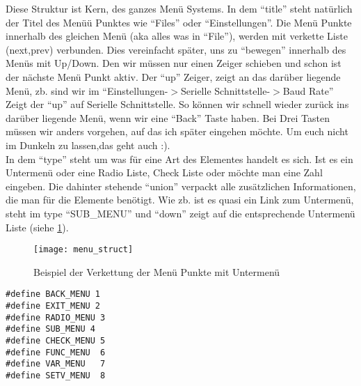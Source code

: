 \documentclass[a4paper]{article}
\begin{document}
Diese Struktur ist Kern, des ganzes Menü Systems. In dem ``title'' steht natürlich der Titel des Menü\"u Punktes wie ``Files'' oder ``Einstellungen''. Die Menü Punkte innerhalb des gleichen Menü (aka alles was in ``File''), werden mit verkette Liste (next,prev) verbunden. Dies vereinfacht später, uns zu ``bewegen'' innerhalb des Menüs mit Up/Down. Den wir müssen nur einen Zeiger schieben und schon ist der nächste Menü Punkt aktiv. Der ``up'' Zeiger, zeigt an das darüber liegende Menü, zb. sind wir im ``Einstellungen-$>$Serielle Schnittstelle-$>$Baud Rate'' Zeigt der ``up'' auf Serielle Schnittstelle. So können wir schnell wieder zurück ins darüber liegende Menü, wenn wir eine ``Back'' Taste haben. Bei Drei Tasten müssen wir anders vorgehen, auf das ich später eingehen möchte. Um euch nicht im Dunkeln zu lassen,das geht auch :).\\
In dem ``type'' steht um was für eine Art des Elementes handelt es sich. Ist es ein Untermenü oder eine Radio Liste, Check Liste oder möchte man eine Zahl eingeben. Die dahinter stehende ``union'' verpackt alle zusätzlichen Informationen, die man für die Elemente benötigt. Wie zb. ist es quasi ein Link zum Untermenü, steht im type ``SUB\_MENU'' und ``down'' zeigt auf die entsprechende Untermenü Liste (siehe \ref{fig:link}).
\begin{figure}
\begin{center}
\texttt{[image: menu\_struct]}
\label{fig:link}
\caption{Beispiel der Verkettung der Menü Punkte mit Untermenü}
\end{center}
\end{figure} 

\begin{lstlisting}[label=fig:def,caption={Definition der Menü Typen}]
#define BACK_MENU 1
#define EXIT_MENU 2
#define RADIO_MENU 3
#define SUB_MENU 4
#define CHECK_MENU 5
#define FUNC_MENU  6
#define VAR_MENU   7
#define SETV_MENU  8
\end{lstlisting}
\end{document}
